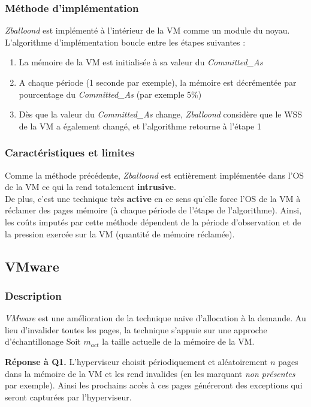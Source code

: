 \subsubsection{Méthode d'implémentation}
\textit{Zballoond} est implémenté à l'intérieur de la VM comme un module du noyau. L'algorithme d'implémentation boucle entre les étapes suivantes : 
\begin{enumerate}[label=\textbf{(\roman*)}]
    \item La mémoire de la VM est initialisée à sa valeur du \textit{Committed\_As}
    \item A chaque période (1 seconde par exemple), la mémoire est décrémentée par pourcentage du \textit{Committed\_As} (par exemple 5\%)
    \item Dès que la valeur du \textit{Committed\_As} change, \textit{Zballoond} considère que le WSS de la VM a également changé, et l'algorithme retourne à l'étape 1
\end{enumerate}

\subsubsection{Caractéristiques et limites}
Comme la méthode précédente, \textit{Zballoond} est entièrement implémentée dans l'OS de la VM ce qui la rend totalement \textbf{intrusive}.\\ 
De plus, c'est une technique très \textbf{active} en ce sens qu'elle force l'OS de la VM à réclamer des pages mémoire (à chaque période de l'étape de l'algorithme). Ainsi, les coûts imputés par cette méthode dépendent de la période d'observation et de la pression exercée sur la VM (quantité de mémoire réclamée).

\subsection{VMware}

\subsubsection{Description}
\textit{VMware} \cite{article10} est une amélioration de la technique naïve d'allocation à la demande. Au lieu d'invalider toutes les pages, la technique s'appuie sur une approche d'échantillonage Soit $\textit{m}_\textit{act}$ la taille actuelle de la mémoire de la VM.

\par{\textbf{Réponse à Q1.}} L'hyperviseur choisit périodiquement et aléatoirement $n$ pages dans la mémoire de la VM et les rend invalides (en les marquant \textit{non présentes} par exemple). Ainsi les prochains accès à ces pages généreront des exceptions qui seront capturées par l'hyperviseur.


